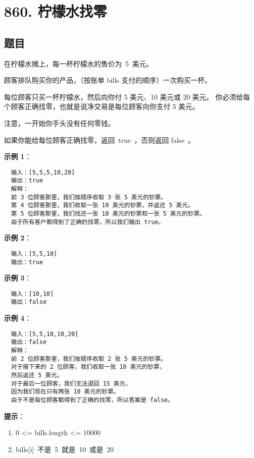 \newpage
\section{860. 柠檬水找零}
\label{leetcode:860}

\subsection{题目}

在柠檬水摊上，每一杯柠檬水的售价为 5 美元。

顾客排队购买你的产品，（按账单 bills 支付的顺序）一次购买一杯。

每位顾客只买一杯柠檬水，然后向你付 5 美元、10 美元或 20 美元。
你必须给每个顾客正确找零，也就是说净交易是每位顾客向你支付 5 美元。

注意，一开始你手头没有任何零钱。

如果你能给每位顾客正确找零，返回 true ，否则返回 false 。

\textbf{示例 1}：

\begin{verbatim}
  输入：[5,5,5,10,20]
  输出：true
  解释：
  前 3 位顾客那里，我们按顺序收取 3 张 5 美元的钞票。
  第 4 位顾客那里，我们收取一张 10 美元的钞票，并返还 5 美元。
  第 5 位顾客那里，我们找还一张 10 美元的钞票和一张 5 美元的钞票。
  由于所有客户都得到了正确的找零，所以我们输出 true。
\end{verbatim}

\textbf{示例 2}：

\begin{verbatim}
  输入：[5,5,10]
  输出：true
\end{verbatim}

\textbf{示例 3}：

\begin{verbatim}
  输入：[10,10]
  输出：false
\end{verbatim}

\textbf{示例 4}：

\begin{verbatim}
  输入：[5,5,10,10,20]
  输出：false
  解释：
  前 2 位顾客那里，我们按顺序收取 2 张 5 美元的钞票。
  对于接下来的 2 位顾客，我们收取一张 10 美元的钞票，
  然后返还 5 美元。
  对于最后一位顾客，我们无法退回 15 美元，
  因为我们现在只有两张 10 美元的钞票。
  由于不是每位顾客都得到了正确的找零，所以答案是 false。
\end{verbatim}

\textbf{提示}：

\begin{enumerate}
  \item 0 <= bills.length <= 10000
  \item bills[i] 不是 5 就是 10 或是 20
\end{enumerate}


